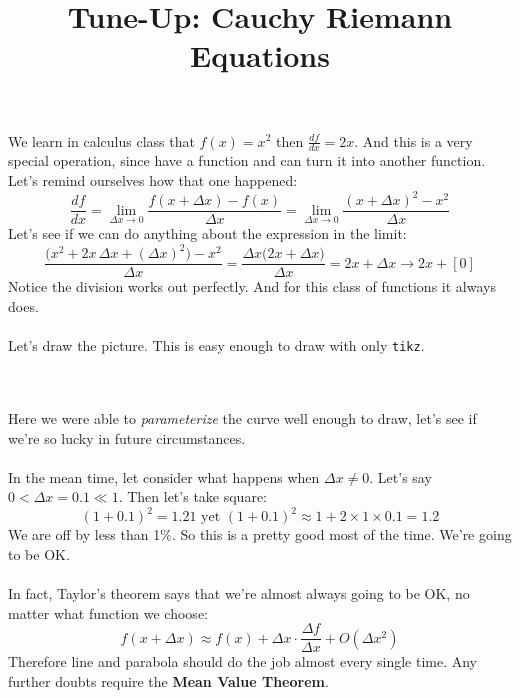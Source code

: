 \documentclass[12pt]{article}
\title{Tune-Up: Cauchy Riemann Equations}
\date{}
\begin{document}
\sffamily

\maketitle

\noindent We learn in calculus class that $f(x) = x^2$ then $\frac{df}{dx} = 2x$. And this is a very special operation, since have a function and can turn it into another function. Let's remind ourselves how that one happened:
$$ \frac{df}{dx} = \lim_{\Delta x \to 0} \frac{f(x+\Delta x) - f(x) }{\Delta x} = \lim_{\Delta x \to 0}\frac{(x + \Delta x)^2 - x^2}{\Delta x} $$
Let's see if we can do anything about the expression in the limit:
$$ \frac{ \big(x^2 + 2x \, \Delta x + (\Delta x)^2 \big) - x^2 }{\Delta x} 
= \frac{ \Delta x \big(  2x + \Delta x \big) }{\Delta x} = 2x + \Delta x \to 2x + [0]$$
Notice the division works out perfectly.  And for this class of functions it always does. \\ \\
Let's draw the picture.  This is easy enough to draw with only \texttt{tikz}.\\ \\
 \\ 
Here we were able to \textit{parameterize} the curve well enough to draw, let's see if we're so lucky in future circumstances. \\ \\
In the mean time, let consider what happens when $\Delta x \neq 0$.  Let's say $0 < \Delta x = 0.1 \ll 1$.  Then let's take square:
$$  (1 + 0.1)^2 = 1.21 \text{ yet } (1+0.1)^2 \approx 1 + 2 \times 1 \times 0.1 = 1.2$$
We are off by less than 1\%.  So this is a pretty good most of the time.  We're going to be OK. \\ \\
In fact, Taylor's theorem says that we're almost always going to be OK, no matter what function we choose:
$$ f(x + \Delta x) \approx f(x) + \Delta x \cdot \frac{\Delta f}{\Delta x} + O(\Delta x^2) $$
Therefore line and parabola should do the job almost every single time.  Any further doubts require the \textbf{Mean Value Theorem}.
\end{document}
